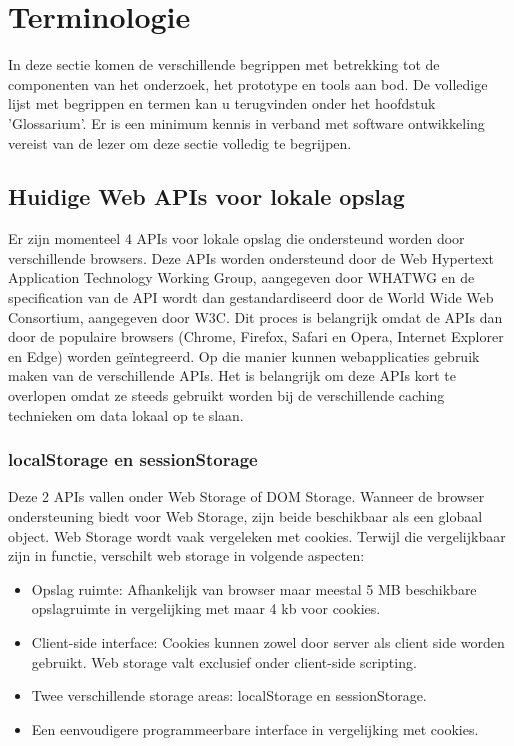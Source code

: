 \section{Terminologie}
\label{sec:terminologie}
In deze sectie komen de verschillende begrippen met betrekking tot de componenten van het onderzoek, het prototype en tools aan bod. De volledige lijst met begrippen en termen kan u terugvinden onder het hoofdstuk 'Glossarium'. Er is een minimum kennis in verband met software ontwikkeling vereist van de lezer om deze sectie volledig te begrijpen.
\subsection{Huidige Web APIs voor lokale opslag}
Er zijn momenteel 4 APIs voor lokale opslag die ondersteund worden door verschillende browsers. Deze APIs worden ondersteund door de Web Hypertext Application Technology Working Group, aangegeven door WHATWG en de specification van de API wordt dan gestandardiseerd door de World Wide Web Consortium, aangegeven door W3C. Dit proces is belangrijk omdat de APIs dan door de populaire browsers (Chrome, Firefox, Safari en Opera, Internet Explorer en Edge) worden ge\"integreerd. Op die manier kunnen webapplicaties gebruik maken van de verschillende APIs. Het is belangrijk om deze APIs kort te overlopen omdat ze steeds gebruikt worden bij de verschillende caching technieken om data lokaal op te slaan.
\subsubsection{localStorage en sessionStorage}
Deze 2 APIs vallen onder Web Storage of DOM Storage. Wanneer de browser ondersteuning biedt voor Web Storage, zijn beide beschikbaar als een globaal object. Web Storage wordt vaak vergeleken met cookies. Terwijl die vergelijkbaar zijn in functie, verschilt web storage in volgende aspecten: 
\begin{itemize}  
\item Opslag ruimte: Afhankelijk van browser maar meestal 5 MB beschikbare opslagruimte in vergelijking met maar 4 kb voor cookies.
\item Client-side interface: Cookies kunnen zowel door server als client side worden gebruikt. Web storage valt exclusief onder client-side scripting.
\item Twee verschillende storage areas: localStorage en sessionStorage.
\item Een eenvoudigere programmeerbare interface in vergelijking met cookies.
\end{itemize}
